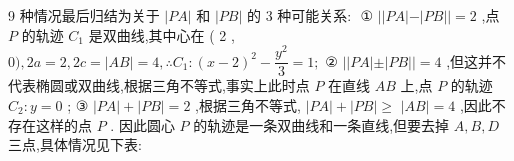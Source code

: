 9 种情况最后归结为关于 $\left| {PA}\right|$ 和 $\left| {PB}\right|$ 的 3 种可能关系: $\text{ ① }\left| \right| {PA}\left| -\right| {PB}\left| \right|  = 2$ ,点 $P$ 的轨迹 ${C}_{1}$ 是双曲线,其中心在 ( 2 , $0),{2a} = 2,{2c} = \left| {AB}\right|  = 4,\therefore {C}_{1} : {\left( x - 2\right) }^{2} - \dfrac{{y}^{2}}{3} = 1;$ ② $\left| \right| {PA}\left| \pm \right| {PB}\left| \right|  = 4$ ,但这并不代表椭圆或双曲线,根据三角不等式,事实上此时点 $P$ 在直线 ${AB}$ 上,点 $P$ 的轨迹 ${C}_{2} : y = 0$ ; ③ $\left| {PA}\right|  + \left| {PB}\right|  = 2$ ,根据三角不等式, $\left| {PA}\right|  + \left| {PB}\right|  \geq$  $\left| {AB}\right|  = 4$ ,因此不存在这样的点 $P$ . 因此圆心 $P$ 的轨迹是一条双曲线和一条直线,但要去掉 $A,B,D$ 三点,具体情况见下表:

\begin{center}
\end{center}

